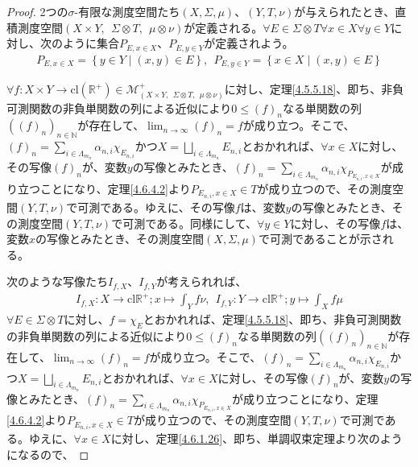 \documentclass[dvipdfmx]{jsarticle}
\begin{document}
\begin{proof}
2つの$\sigma$-有限な測度空間たち$(X,\varSigma,\mu)$、$(Y,T,\nu)$が与えられたとき、直積測度空間$(X \times Y,\ \ \varSigma \otimes T,\ \ \mu \otimes \nu)$が定義される。$\forall E \in \varSigma \otimes T\forall x \in X\forall y \in Y$に対し、次のように集合$P_{E,x \in X}$、$P_{E,y \in Y}$が定義されよう。
\begin{align*}
P_{E,x \in X} = \left\{ y \in Y \middle| (x,y) \in E \right\},\ \ P_{E,y \in Y} = \left\{ x \in X \middle| (x,y) \in E \right\}
\end{align*}\par
$\forall f:X \times Y \rightarrow \mathrm{cl}\left( \mathbb{R}^{\mathbf{+}} \right) \in \mathcal{M}_{(X \times Y,\ \ \varSigma \otimes T,\ \ \mu \otimes \nu)}^{+}$に対し、定理\ref{4.5.5.18}、即ち、非負可測関数の非負単関数の列による近似により$0 \leq (f)_{n}$なる単関数の列$\left( (f)_{n} \right)_{n \in \mathbb{N}}$が存在して、$\lim_{n \rightarrow \infty}(f)_{n} = f$が成り立つ。そこで、$(f)_{n} = \sum_{i \in \varLambda_{m_{n}}} {\alpha_{n,i}\chi_{E_{n,i}}}$かつ$X = \bigsqcup_{i \in \varLambda_{m_{n}}} E_{n,i}$とおかれれば、$\forall x \in X$に対し、その写像$(f)_{n}$が、変数$y$の写像とみたとき、$(f)_{n} = \sum_{i \in \varLambda_{m_{n}}} {\alpha_{n,i}\chi_{P_{E_{n,i},x \in X}}}$が成り立つことになり、定理\ref{4.6.4.2}より$P_{E_{n,i},x \in X} \in T$が成り立つので、その測度空間$(Y,T,\nu)$で可測である。ゆえに、その写像$f$は、変数$y$の写像とみたとき、その測度空間$(Y,T,\nu)$で可測である。同様にして、$\forall y \in Y$に対し、その写像$f$は、変数$x$の写像とみたとき、その測度空間$(X,\varSigma,\mu)$で可測であることが示される。\par
次のような写像たち$I_{f,X}$、$I_{f,Y}$が考えられれば、
\begin{align*}
I_{f,X}:X \rightarrow \mathrm{cl}\mathbb{R}^{+};x \mapsto \int_{Y} {f\nu},\ \ I_{f,Y}:Y \rightarrow \mathrm{cl}\mathbb{R}^{+};y \mapsto \int_{X} {f\mu}
\end{align*}
$\forall E \in \varSigma \otimes T$に対し、$f = \chi_{E}$とおかれれば、定理\ref{4.5.5.18}、即ち、非負可測関数の非負単関数の列による近似により$0 \leq (f)_{n}$なる単関数の列$\left( (f)_{n} \right)_{n \in \mathbb{N}}$が存在して、$\lim_{n \rightarrow \infty}(f)_{n} = f$が成り立つ。そこで、$(f)_{n} = \sum_{i \in \varLambda_{m_{n}}} {\alpha_{n,i}\chi_{E_{n,i}}}$かつ$X = \bigsqcup_{i \in \varLambda_{m_{n}}} E_{n,i}$とおかれれば、$\forall x \in X$に対し、その写像$(f)_{n}$が、変数$y$の写像とみたとき、$(f)_{n} = \sum_{i \in \varLambda_{m_{n}}} {\alpha_{n,i}\chi_{P_{E_{n,i},x \in X}}}$が成り立つことになり、定理\ref{4.6.4.2}より$P_{E_{n,i},x \in X} \in T$が成り立つので、その測度空間$(Y,T,\nu)$で可測である。ゆえに、$\forall x \in X$に対し、定理\ref{4.6.1.26}、即ち、単調収束定理より次のようになるので、

\end{proof}
\end{document}
